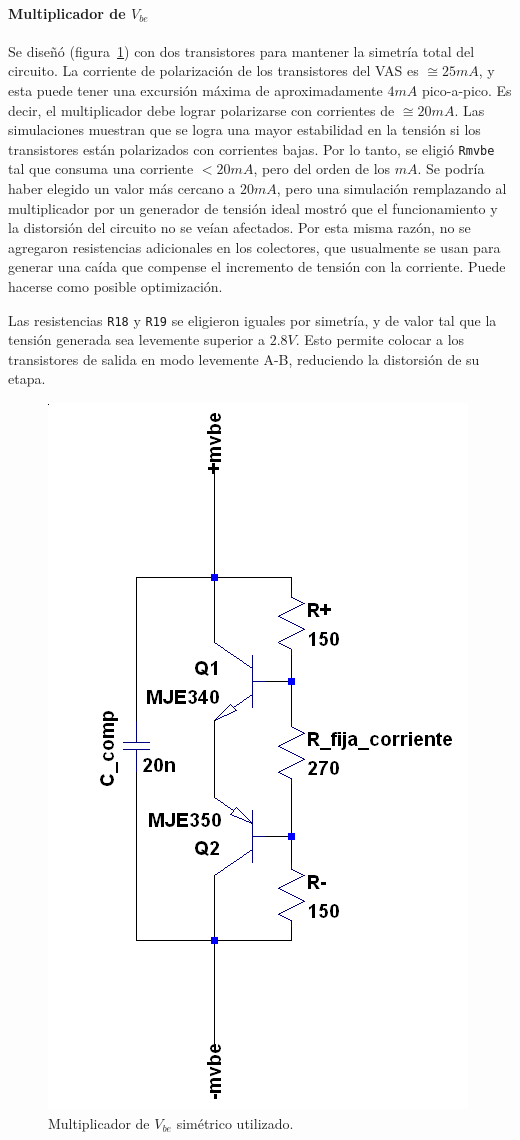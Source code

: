 \documentclass[a4paper,12pt,twoside]{article}
\begin{document}
\paragraph{Multiplicador de $V_{be}$}


Se diseñó (figura~\ref{fig:mvbe}) con dos transistores para mantener la simetría total del circuito. La corriente de polarización de los transistores del VAS es $\cong 25mA$, y esta puede tener una excursión máxima de aproximadamente $4mA$ pico-a-pico. Es decir, el multiplicador debe lograr polarizarse con corrientes de $\cong 20mA$. Las simulaciones muestran que se logra una mayor estabilidad en la tensión si los transistores están polarizados con corrientes bajas. Por lo tanto, se eligió \texttt{Rmvbe} tal que consuma una corriente $<20mA$, pero del orden de los $mA$. Se podría haber elegido un valor más cercano a $20mA$, pero una simulación remplazando al multiplicador por un generador de tensión ideal mostró que el funcionamiento y la distorsión del circuito no se veían afectados. Por esta misma razón, no se agregaron resistencias adicionales en los colectores, que usualmente se usan para generar una caída que compense el incremento de tensión con la corriente. Puede hacerse como posible optimización.

Las resistencias \texttt{R18} y \texttt{R19} se eligieron iguales por simetría, y de valor tal que la tensión generada sea levemente superior a $2.8V$. Esto permite colocar a los transistores de salida en modo levemente A-B, reduciendo la distorsión de su etapa.


\begin{figure}[H]
\centering
\includegraphics[height=0.3\textwidth]{img/sim/mvbe}
\caption{Multiplicador de $V_{be}$ simétrico utilizado.}
\label{fig:mvbe} 
\end{figure}
\end{document}
